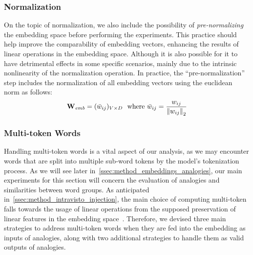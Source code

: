 \subsubsection{Normalization}

On the topic of normalization, we also include the possibility of \emph{pre-normalizing} the embedding space before performing the experiments.
This practice should help improve the comparability of embedding vectors, enhancing the results of linear operations in the embedding space.
Although it is also possible for it to have detrimental effects in some specific scenarios, mainly due to the intrinsic nonlinearity of the normalization operation.
In practice, the ``pre-normalization'' step includes the normalization of all embedding vectors using the euclidean norm as follows:
\begin{equation}
    \label{eq:method_embeddings_normalization}
    \bm{\mathbf{W}}_{\textit{emb}} = (\bar w_{ij})_{V \times D}
    \ \ \text{where}\ \bar w_{ij} = \frac{w_{ij}}{{\| w_{ij} \|}_2}
\end{equation}

\subsubsection{Multi-token Words}

Handling multi-token words is a vital aspect of our analysis, as we may encounter words that are split into multiple sub-word tokens by the model's tokenization process.
As we will see later in~\cref{ssec:method_embeddings_analogies}, our main experiments for this section will concern the evaluation of analogies and similarities between word groups.
As anticipated in~\cref{ssec:method_intravisto_injection}, the main choice of computing multi-token falls towards the usage of linear operations from the supposed preservation of linear features in the embedding space~\cite{mikolov2013,park2023}.
Therefore, we devised three main strategies to address multi-token words when they are fed into the embedding as inputs of analogies, along with two additional strategies to handle them as valid outputs of analogies.

